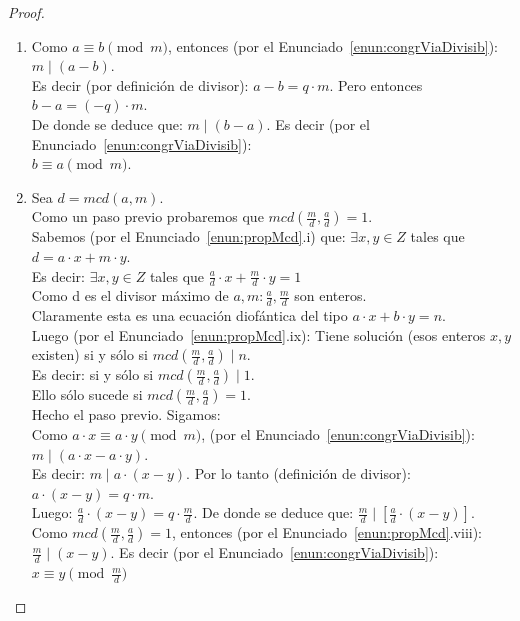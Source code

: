 \begin{proof}
\begin{enumerate}[label=\roman*)]
Como $mcd(m, n)=1$ (por el Enunciado~\ref{enun:propMcd}.viii): $m \mid (a-b) \quad$ Luego (por el Enunciado~\ref{enun:congrViaDivisib}): $a \equiv b \pmod  m$.
\item Como $a \equiv b \pmod  m$, entonces (por el Enunciado~\ref{enun:congrViaDivisib}): $m \mid (a-b)$. \\
Es decir (por definición de divisor): $a-b=q \cdot m$. Pero entonces $b-a=(-q) \cdot m$.\\
De donde se deduce que: $m \mid (b-a)$. Es decir (por el Enunciado~\ref{enun:congrViaDivisib}):\\
$b \equiv a \pmod  m$.
\item Sea $d=mcd(a, m)$. \\
Como un paso previo probaremos que $mcd(\frac{m}{d},\frac{a}{d})=1$.\\
Sabemos (por el Enunciado~\ref{enun:propMcd}.i) que: $\exists x,y \in Z$ tales que $d=a \cdot x+m \cdot y$. \\
Es decir: $\exists x, y \in Z$ tales que $\frac{a}{d} \cdot x + \frac{m}{d} \cdot y=1$\\
Como d es el divisor máximo de $a, m: \frac{a}{d}, \frac{m}{d}$ son enteros.\\
Claramente esta es una ecuación diofántica del tipo $a \cdot x+b \cdot y=n$.\\
Luego (por el Enunciado~\ref{enun:propMcd}.ix): Tiene solución (esos enteros $x, y$ existen) si y sólo si $mcd(\frac{m}{d}, \frac{a}{d}) \mid n$.\\
Es decir: si y sólo si $mcd(\frac{m}{d}, \frac{a}{d}) \mid 1$.\\
Ello sólo sucede si $mcd(\frac{m}{d},\frac{a}{d})=1$.\\
Hecho el paso previo. Sigamos:\\
Como $a \cdot x \equiv a \cdot y \pmod  m$, (por el Enunciado~\ref{enun:congrViaDivisib}): $m \mid  (a \cdot x-a \cdot y)$. \\
Es decir: $m \mid  a \cdot(x-y)$. Por lo tanto (definición de divisor): $a \cdot (x-y)=q \cdot m$.\\
Luego: $\frac{a}{d} \cdot (x-y)=q \cdot \frac{m}{d}$. De donde se deduce que: $\frac{m}{d} \mid [\frac{a}{d} \cdot(x-y)]$.\\
Como $mcd(\frac{m}{d}, \frac{a}{d})=1$, entonces (por el Enunciado~\ref{enun:propMcd}.viii):\\
$\frac{m}{d} \mid(x-y)$. Es decir (por el Enunciado~\ref{enun:congrViaDivisib}): $x \equiv y \pmod  {\frac{m}{d}}$\\

\end{enumerate}
\end{proof}
